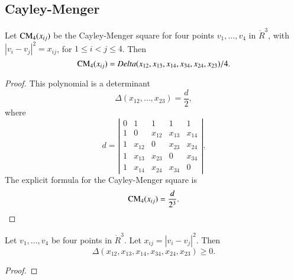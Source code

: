 \begin{tarskidata}
\begin{tarski}
\subsection{Cayley-Menger}

\begin{lemma}
	Let ${\operatorname{CM}}_4(x_{ij})$ be the Cayley-Menger square for
four points $v_1,\ldots,v_4$ in $\ring{R}^3$, with $|v_i-v_j|^2 = x_{ij}$,
for $1\le i < j \le 4$.  Then
	$${\operatorname{CM}}_4(x_{ij}) = Delta(x_{12},x_{13},x_{14},x_{34},x_{24},x_{23})/4.$$
\end{lemma}

\begin{proof}
This polynomial is a determinant  $$\Delta(x_{12},\ldots,x_{23}) = \frac{d}{2},$$
where $$
     d=\left|\begin{matrix}
     0 & 1 & 1 & 1 & 1\\
     1 & 0 & x_{12} & x_{13} & x_{14} \\
     1 & x_{12} & 0 & x_{23} & x_{24} \\
     1 & x_{13} & x_{23} & 0 & x_{34} \\
     1 & x_{14} & x_{24} & x_{34} & 0
  \end{matrix}\right|.
  $$
The explicit formula for the Cayley-Menger
square is
	$$
	{\operatorname{CM}}_4(x_{ij}) = \frac{d}{2^3}.
	$$
\end{proof}
\end{tarski}




\begin{tarski}

\begin{lemma}
Let $v_1,\ldots,v_4$ be four points
in $\ring{R}^3$.  Let $x_{ij} = |v_i-v_j|^2$.  Then
	$$\Delta(x_{12},x_{13},x_{14},x_{34},x_{24},x_{23})\ge0.$$
\end{lemma}

\begin{proof}
\end{proof}
\end{tarski}



\begin{tarski}


\end{tarski}
\end{tarskidata}
